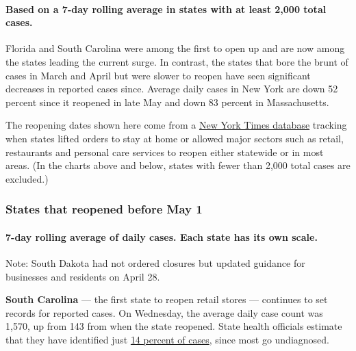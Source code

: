 \hypertarget{based-on-a-7-day-rolling-average-in-states-with-at-least-2000-total-cases}{%
\paragraph{Based on a 7-day rolling average in states with at least
2,000 total
cases.}\label{based-on-a-7-day-rolling-average-in-states-with-at-least-2000-total-cases}}

Florida and South Carolina were among the first to open up and are now
among the states leading the current surge. In contrast, the states that
bore the brunt of cases in March and April but were slower to reopen
have seen significant decreases in reported cases since. Average daily
cases in New York are down 52 percent since it reopened in late May and
down 83 percent in Massachusetts.

The reopening dates shown here come from a
\href{https://www.nytimes.com/interactive/2020/us/states-reopen-map-coronavirus.html}{New
York Times database} tracking when states lifted orders to stay at home
or allowed major sectors such as retail, restaurants and personal care
services to reopen either statewide or in most areas. (In the charts
above and below, states with fewer than 2,000 total cases are excluded.)

\hypertarget{states-that-reopened-before-may-1}{%
\subsubsection{States that reopened before May
1}\label{states-that-reopened-before-may-1}}

\hypertarget{7-day-rolling-average-of-daily-cases-each-state-has-its-own-scale}{%
\paragraph{7-day rolling average of daily cases. Each state has its own
scale.}\label{7-day-rolling-average-of-daily-cases-each-state-has-its-own-scale}}

Note: South Dakota had not ordered closures but updated guidance for
businesses and residents on April 28.

\textbf{South Carolina} --- the first state to reopen retail stores ---
continues to set records for reported cases. On Wednesday, the average
daily case count was 1,570, up from 143 from when the state reopened.
State health officials estimate that they have identified just
\href{https://www.thestate.com/news/coronavirus/article244080492.html}{14
percent of cases}, since most go undiagnosed.

